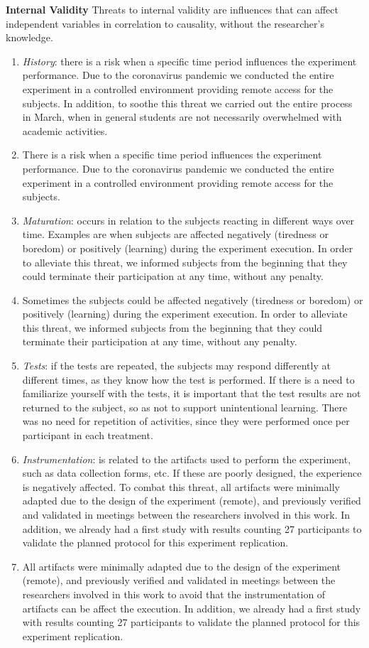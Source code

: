 \textbf{Internal Validity}
Threats to internal validity are influences that can affect independent variables in correlation to causality, without the researcher's knowledge.
\begin{enumerate} [label=\roman*]
    \item \textit{History}: there is a risk when a specific time period influences the experiment performance. Due to the coronavirus pandemic we conducted the entire experiment in a controlled environment providing remote access for the subjects. 
    In addition, to soothe this threat we carried out the entire process in March, when in general students are not necessarily overwhelmed with academic activities.
    \item There is a risk when a specific time period influences the experiment performance. Due to the coronavirus pandemic we conducted the entire experiment in a controlled environment providing remote access for the subjects.
    \item \textit{Maturation}: occurs in relation to the subjects reacting in different ways over time. 
    Examples are when subjects are affected negatively (tiredness or boredom) or positively (learning) during the experiment execution.
    In order to alleviate this threat, we informed subjects from the beginning that they could terminate their participation at any time, without any penalty.
    \item Sometimes the subjects could be affected negatively (tiredness or boredom) or positively (learning) during the experiment execution.
    In order to alleviate this threat, we informed subjects from the beginning that they could terminate their participation at any time, without any penalty.
    \item \textit{Tests}: if the tests are repeated, the subjects may respond differently at different times, as they know how the test is performed. 
    If there is a need to familiarize yourself with the tests, it is important that the test results are not returned to the subject, so as not to support unintentional learning. 
    There was no need for repetition of activities, since they were performed once per participant in each treatment.
    \item \textit{Instrumentation}: is related to the artifacts used to perform the experiment, such as data collection forms, etc. 
    If these are poorly designed, the experience is negatively affected.
    To combat this threat, all artifacts were minimally adapted due to the design of the experiment (remote), and previously verified and validated in meetings between the researchers involved in this work.
    In addition, we already had a first study with results counting 27 participants to validate the planned protocol for this experiment replication.
    \item All artifacts were minimally adapted due to the design of the experiment (remote), and previously verified and validated in meetings between the researchers involved in this work to avoid that the instrumentation of artifacts can be affect the execution.
    In addition, we already had a first study with results counting 27 participants to validate the planned protocol for this experiment replication.
\end{enumerate}

